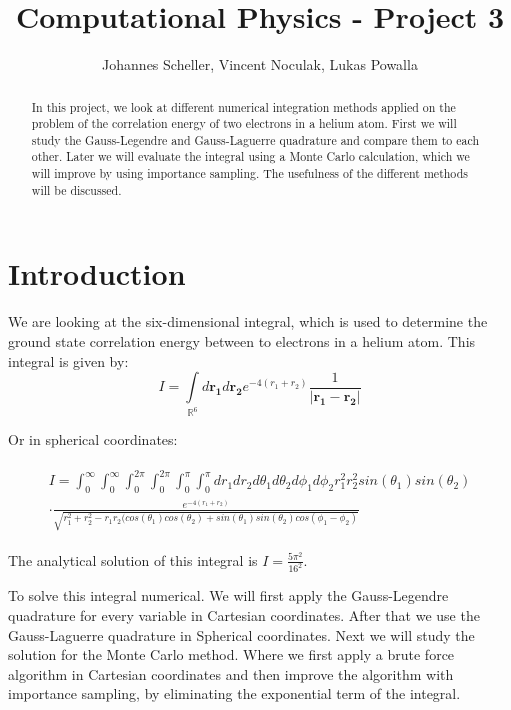 \documentclass[10pt,a4paper]{article}
\author{Johannes Scheller, Vincent Noculak, Lukas Powalla}
\title{Computational Physics - Project 3}
\begin{document}
\maketitle
\newpage
\tableofcontents
\newpage

\begin{abstract}
	
In this project, we look at different numerical integration methods applied on the problem of the correlation energy of two electrons in a helium atom. First we will study the Gauss-Legendre and Gauss-Laguerre quadrature and compare them to each other. Later we will evaluate the integral using a Monte Carlo calculation, which we will improve by using importance sampling. The usefulness of the different methods will be discussed.
	
\end{abstract}

\section{Introduction}

We are looking at the six-dimensional integral, which is used to determine the ground state correlation energy between to electrons in a helium atom. This integral is given by: 
\begin{equation}
I = \int\limits_{\mathbb{R}^6} d\mathbf{r_1} d\mathbf{r_2} e^{-4 (r_1+r_2)} \frac{1}{|\mathbf{r_1} - \mathbf{r_2}|} 
\end{equation}

Or in spherical coordinates:

\begin{align}
	\begin{split}
    I = \int_0^\infty \int_0^\infty  \int_0^{2 \pi} \int_0^{2 \pi}  \int_0^\pi \int_0^\pi dr_1 dr_2 d\theta_1 d\theta_2 d\phi_1 d\phi_2    r_1^2 r_2^2 sin(\theta_1) sin(\theta_2)\\ \cdot \frac{e^{-4(r_1+r_2)}} {\sqrt{r_1^2+r_2^2-r_1r_2(cos(\theta_1)cos(\theta_2)+sin(\theta_1)sin(\theta_2)cos(\phi_1-\phi_2)}}
   	\end{split}
\end{align}

The analytical solution of this integral is $I = \frac{5 \pi^2}{16^2}$.

To solve this integral numerical. We will first apply the Gauss-Legendre quadrature for every variable in Cartesian coordinates. After that we use the Gauss-Laguerre quadrature in Spherical coordinates. Next we will study the solution for the Monte Carlo method. Where we first apply a brute force algorithm in Cartesian coordinates and then improve the algorithm with importance sampling, by eliminating the exponential term of the integral.
\end{document}
